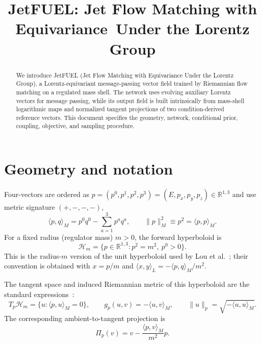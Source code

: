 \documentclass[10pt]{article}
\title{JetFUEL: Jet Flow Matching with Equivariance\
Under the Lorentz Group}
\author{}
\date{}
\newcommand{\HH}{\mathcal{H}}
\newcommand{\Proj}{\Pi}
\newcommand{\R}{\mathbb{R}}
\begin{document}
\maketitle

\begin{abstract}
We introduce JetFUEL (Jet Flow Matching with Equivariance Under the Lorentz Group),
a Lorentz-equivariant message-passing vector field trained by
Riemannian flow matching on a regulated mass shell. The network uses evolving
auxiliary Lorentz vectors for message passing, while its output field is built
intrinsically from mass-shell logarithmic maps and normalized tangent projections
of two condition-derived reference vectors. This document specifies the geometry,
network, conditional prior, coupling, objective, and sampling procedure.
\end{abstract}

\section{Geometry and notation}

Four-vectors are ordered as $p=(p^0,p^1,p^2,p^3)=(E,p_x,p_y,p_z)\in\R^{1,3}$
and use metric signature $(+,-,-,-)$,
\begin{equation}
 \langle p,q\rangle_M=p^0q^0-\sum_{a=1}^3p^aq^a,
 \qquad \|p\|_M^2\equiv p^2=\langle p,p\rangle_M.
\end{equation}
For a fixed radius (regulator mass) $m>0$, the forward hyperboloid is
\begin{equation}
 \HH_m=\{p\in\R^{1,3}:p^2=m^2,\ p^0>0\}.
\end{equation}
This is the radius-$m$ version of the unit hyperboloid used by
Lou et al.~\cite[Table~2]{lou2020neural}; their convention is obtained with
$x=p/m$ and $\langle x,y\rangle_L=-\langle p,q\rangle_M/m^2$.

The tangent space and induced Riemannian metric of this hyperboloid are
the standard expressions~\cite[Table~2]{lou2020neural}:
\begin{equation}
 T_p\HH_m=\{u:\langle p,u\rangle_M=0\},\qquad
 g_p(u,v)=-\langle u,v\rangle_M,\qquad
 \|u\|_p=\sqrt{-\langle u,u\rangle_M}.
\end{equation}
The corresponding ambient-to-tangent projection is~\cite[Table~2]{lou2020neural}
\begin{equation}
 \Proj_p(v)=v-\frac{\langle p,v\rangle_M}{m^2}p.
 \label{eq:projection}
\end{equation}
\end{document}
